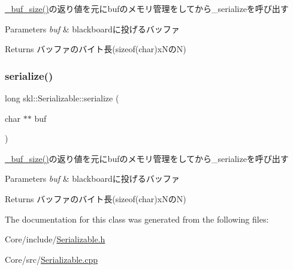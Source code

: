 \hyperlink{classskl_1_1_serializable_a489e26e25bacf78d0dae50f0286c62b5}{\+\_\+buf\+\_\+size()}の返り値を元にbufのメモリ管理をしてから\+\_\+serializeを呼び出す 


\begin{DoxyParams}{Parameters}
{\em buf} & blackboardに投げるバッファ \\
\hline
\end{DoxyParams}
\begin{DoxyReturn}{Returns}
バッファのバイト長(sizeof(char)x\+NのN) 
\end{DoxyReturn}
\hypertarget{classskl_1_1_serializable_a4bd0c82fdb8a663215b54671df1222f2}{}\label{classskl_1_1_serializable_a4bd0c82fdb8a663215b54671df1222f2} 
\subsubsection{\texorpdfstring{serialize()}{serialize()}}
{\footnotesize\ttfamily long skl\+::\+Serializable\+::serialize (\begin{DoxyParamCaption}\item[{char $\ast$$\ast$}]{buf }\end{DoxyParamCaption})\hspace{0.3cm}{\ttfamily [virtual]}}



\hyperlink{classskl_1_1_serializable_a489e26e25bacf78d0dae50f0286c62b5}{\+\_\+buf\+\_\+size()}の返り値を元にbufのメモリ管理をしてから\+\_\+serializeを呼び出す 


\begin{DoxyParams}{Parameters}
{\em buf} & blackboardに投げるバッファ \\
\hline
\end{DoxyParams}
\begin{DoxyReturn}{Returns}
バッファのバイト長(sizeof(char)x\+NのN) 
\end{DoxyReturn}


The documentation for this class was generated from the following files\+:\begin{DoxyCompactItemize}
\item 
Core/include/\hyperlink{_serializable_8h}{Serializable.\+h}\item 
Core/src/\hyperlink{_serializable_8cpp}{Serializable.\+cpp}\end{DoxyCompactItemize}
